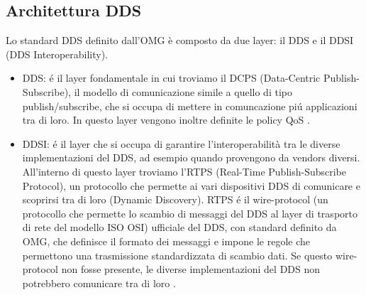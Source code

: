 \subsection{Architettura DDS}
Lo standard DDS definito dall'OMG è composto da due layer: 
il DDS e il
DDSI (DDS Interoperability).
    \begin{itemize}
        \item DDS: é il layer fondamentale in cui troviamo il DCPS
        (Data-Centric Publish-Subscribe),
        il modello di comunicazione simile a quello di tipo publish/subscribe,
        che si occupa di mettere in comuncazione piú applicazioni 
        tra di loro. In questo layer vengono inoltre 
        definite le policy QoS \cite{Michaud2017Apr}.
        \item DDSI: é il layer che si occupa di garantire l'interoperabilità
        tra le diverse implementazioni del DDS, ad
        esempio quando provengono da vendors diversi.
        All'interno di questo layer troviamo l'RTPS 
        (Real-Time Publish-Subscribe Protocol), un protocollo che permette ai 
        vari dispositivi DDS di comunicare e scoprirsi tra di loro
        (Dynamic Discovery).
        RTPS é il wire-protocol (un protocollo che permette lo scambio di 
        messaggi del DDS al layer di trasporto di rete 
        del modello ISO OSI) ufficiale del DDS, 
        con standard definito da OMG,
        che definisce il formato dei messaggi e impone le regole che 
        permettono una trasmissione standardizzata di scambio dati. 
        Se questo wire-protocol non fosse presente,
        le diverse implementazioni del DDS non potrebbero 
        comunicare tra di loro \cite{essay93639}.
    \end{itemize} 











